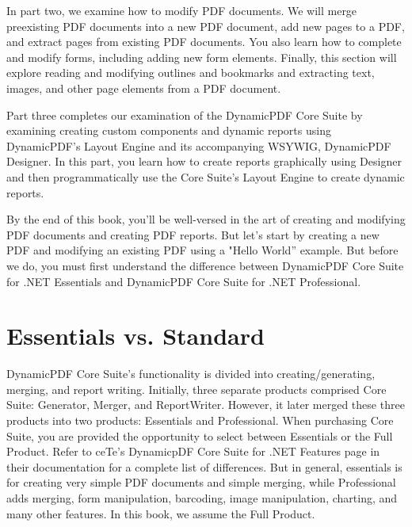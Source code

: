 \documentclass[american,letterpaper]{tufte-book}
\numberwithin{equation}{section}
\numberwithin{figure}{section}
\begin{document}
In part two, we examine how to modify PDF documents. We will merge preexisting PDF documents into a new PDF document, add new pages to a PDF, and extract pages from existing PDF documents. You also learn how to complete and modify forms, including adding new form elements. Finally, this section will explore reading and modifying outlines and bookmarks and extracting text, images, and other page elements from a PDF document.

Part three completes our examination of the DynamicPDF Core Suite by examining creating custom components and dynamic reports using DynamicPDF's Layout Engine and its accompanying WSYWIG, DynamicPDF Designer. In this part, you learn how to create reports graphically using Designer and then programmatically use the Core Suite's Layout Engine to create dynamic reports. 

By the end of this book, you'll be well-versed
in the art of creating and modifying PDF documents and creating PDF reports.  But let's start by creating a new PDF and modifying an existing PDF using
a "Hello World'' example. But before we do, you must first understand
the difference between DynamicPDF Core Suite for .NET Essentials
and DynamicPDF Core Suite for .NET Professional.

\section{Essentials vs. Standard}

DynamicPDF Core Suite’s functionality is divided into creating/generating,
merging, and report writing. Initially, three separate products comprised
Core Suite: Generator, Merger, and ReportWriter. However, it later
merged these three products into two products: Essentials and Professional.
When purchasing Core Suite, you are provided the opportunity to select
between Essentials or the Full Product. Refer to ceTe’s DynamicpDF
Core Suite for .NET Features page in their documentation for a complete
list of differences. But in general, essentials is for creating very simple PDF documents
and simple merging, while Professional adds merging, form manipulation,
barcoding, image manipulation, charting, and many other features.
In this book, we assume the Full Product.
\end{document}
